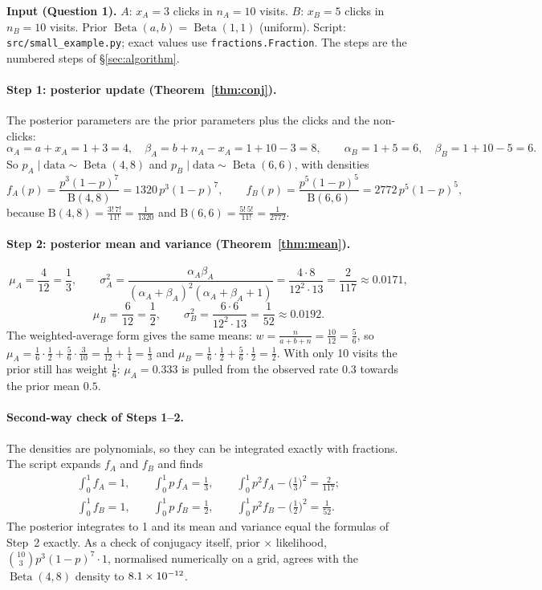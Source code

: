 \documentclass[11pt]{article}
\theoremstyle{definition}
\theoremstyle{remark}
\newcommand{\Betad}{\operatorname{Beta}}
\newcommand{\Bfun}{\mathrm{B}}
\newcommand{\data}{\text{data}}
\begin{document}
\textbf{Input (Question 1).} $A$: $x_A=3$ clicks in $n_A=10$ visits. $B$: $x_B=5$ clicks in $n_B=10$ visits.
Prior $\Betad(a,b)=\Betad(1,1)$ (uniform). Script: \texttt{src/small\_example.py}; exact values use
\texttt{fractions.Fraction}. The steps are the numbered steps of \S\ref{sec:algorithm}.

\paragraph{Step 1: posterior update (Theorem~\ref{thm:conj}).}
The posterior parameters are the prior parameters plus the clicks and the non-clicks:
\[
\alpha_A=a+x_A=1+3=4,\quad \beta_A=b+n_A-x_A=1+10-3=8,\qquad
\alpha_B=1+5=6,\quad \beta_B=1+10-5=6 .
\]
So $p_A\mid\data\sim\Betad(4,8)$ and $p_B\mid\data\sim\Betad(6,6)$, with densities
\[
f_A(p)=\frac{p^{3}(1-p)^{7}}{\Bfun(4,8)}=1320\,p^3(1-p)^7,\qquad
f_B(p)=\frac{p^{5}(1-p)^{5}}{\Bfun(6,6)}=2772\,p^5(1-p)^5,
\]
because $\Bfun(4,8)=\frac{3!\,7!}{11!}=\frac1{1320}$ and $\Bfun(6,6)=\frac{5!\,5!}{11!}=\frac1{2772}$.

\paragraph{Step 2: posterior mean and variance (Theorem~\ref{thm:mean}).}
\[
\mu_A=\frac{4}{12}=\frac13,\qquad
\sigma_A^2=\frac{\alpha_A\beta_A}{(\alpha_A+\beta_A)^2(\alpha_A+\beta_A+1)}=\frac{4\cdot 8}{12^2\cdot 13}=\frac{2}{117}\approx0.0171,
\]
\[
\mu_B=\frac{6}{12}=\frac12,\qquad
\sigma_B^2=\frac{6\cdot 6}{12^2\cdot 13}=\frac{1}{52}\approx0.0192 .
\]
The weighted-average form gives the same means: $w=\frac{n}{a+b+n}=\frac{10}{12}=\frac56$, so
$\mu_A=\frac16\cdot\frac12+\frac56\cdot\frac3{10}=\frac1{12}+\frac14=\frac13$ and
$\mu_B=\frac16\cdot\frac12+\frac56\cdot\frac12=\frac12$. With only 10 visits the prior still has weight $\frac16$:
$\mu_A=0.333$ is pulled from the observed rate $0.3$ towards the prior mean $0.5$.

\paragraph{Second-way check of Steps 1--2.}
The densities are polynomials, so they can be integrated exactly with fractions. The script expands
$f_A$ and $f_B$ and finds
\begin{gather*}
\int_0^1 f_A=1,\qquad \int_0^1 p\,f_A=\tfrac13,\qquad \int_0^1 p^2f_A-\big(\tfrac13\big)^2=\tfrac2{117};\\
\int_0^1 f_B=1,\qquad \int_0^1 p\,f_B=\tfrac12,\qquad \int_0^1 p^2f_B-\big(\tfrac12\big)^2=\tfrac1{52}.
\end{gather*}
The posterior integrates to 1 and its mean and variance equal the formulas of Step~2 exactly. As a check of
conjugacy itself, prior $\times$ likelihood, $\binom{10}{3}p^3(1-p)^7\cdot 1$, normalised numerically on a grid,
agrees with the $\Betad(4,8)$ density to $8.1\times10^{-12}$.
\end{document}

